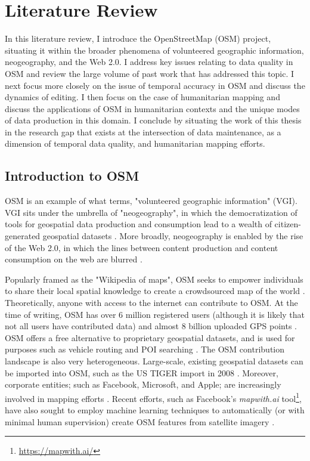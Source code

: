 \chapter{Literature Review}
\label{chapterlabel2}

In this literature review, I introduce the OpenStreetMap (OSM) project, situating it within the broader phenomena of volunteered geographic information, neogeography, and the Web 2.0. I address key issues relating to data quality in OSM and review the large volume of past work that has addressed this topic. I next focus more closely on the issue of temporal accuracy in OSM and discuss the dynamics of editing. I then focus on the case of humanitarian mapping and discuss the applications of OSM in humanitarian contexts and the unique modes of data production in this domain. I conclude by situating the work of this thesis in the research gap that exists at the intersection of data maintenance, as a dimension of temporal data quality, and humanitarian mapping efforts. 

\section{Introduction to OSM}

OSM is an example of what \textcite{goodchild_citizens_2007} terms, "volunteered geographic information" (VGI). VGI sits under the umbrella of "neogeography", in which the democratization of tools for geospatial data production and consumption lead to a wealth of citizen-generated geospatial datasets \parencite{goodchild_neogeography_2009, haklay_web_2008}. More broadly, neogeography is enabled by the rise of the Web 2.0, in which the lines between content production and content consumption on the web are blurred \parencite{oreilly_what_2009}. 

Popularly framed as the "Wikipedia of maps", OSM seeks to empower individuals to share their local spatial knowledge to create a crowdsourced map of the world \parencite{fox_openstreetmap_2012, lu_after_2019}. Theoretically, anyone with access to the internet can contribute to OSM. At the time of writing, OSM has over 6 million registered users (although it is likely that not all users have contributed data) and almost 8 billion uploaded GPS points \parencite{noauthor_openstreetmap_2020}. OSM offers a free alternative to proprietary geospatial datasets, and is used for purposes such as vehicle routing \parencite{graser_is_2015, luxen_real-time_2011} and POI searching \parencite{ruta_indooroutdoor_2015}. The OSM contribution landscape is also very heterogeneous. Large-scale, existing geospatial datasets can be imported into OSM, such as the US TIGER import in 2008 \parencite{zielstra_assessing_2013}. Moreover, corporate entities; such as Facebook, Microsoft, and Apple; are increasingly involved in mapping efforts \parencite{anderson_corporate_2019}. Recent efforts, such as Facebook's \textit{mapwith.ai} tool\footnote{\url{https://mapwith.ai/}}, have also sought to employ machine learning techniques to automatically (or with minimal human supervision) create OSM features from satellite imagery \parencite{albrecht_change_2020, yadav_human_2020}. 

